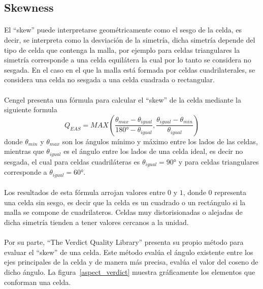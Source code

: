 \documentclass[letterpaper, openright, 12pt]{book}
\begin{document}
    \subsection{Skewness}
    \paragraph*{}
    El ``skew'' puede interpretarse geométricamente como el sesgo de la celda,
    es decir, se interpreta como la desviación de la simetría, dicha simetría
    depende del tipo de celda que contenga la malla, por ejemplo para celdas
    triangulares la simetría corresponde a una celda equilátera la cual por lo
    tanto se considera no sesgada. En el caso en el que la malla está formada
    por celdas cuadrilaterales, se considera una celda no sesgada a una celda
    cuadrada o rectangular.

    \paragraph*{}
    Cengel \cite{cengel} presenta una fórmula para calcular el ``skew'' de la
    celda mediante la siguiente formula
    \begin{equation}
      Q_{EAS} = MAX \left(
      \frac{\theta_{max} - \theta_{igual}}{180\si{\degree} - \theta_{igual}},
      \frac{\theta_{igual} - \theta_{min}}{\theta_{igual}}
      \right)
    \end{equation}
    donde $\theta_{min}$ y $\theta_{max}$ son los ángulos mínimo y máximo entre
    los lados de las celdas, mientras que $\theta_{igual}$ es el ángulo entre
    los lados de una celda ideal, es decir no sesgada, el cual para celdas
    cuadriláteras es $\theta_{igual} = 90\si{\degree}$ y para celdas
    triangulares corresponde a $\theta_{igual} = 60\si{\degree}$.

    \paragraph*{}
    Los resultados de esta fórmula arrojan valores entre $0$ y $1$, donde $0$
    representa una celda sin sesgo, es decir que la celda es un cuadrado o un
    rectángulo si la malla se compone de cuadrilateros. Celdas muy
    distorisionadas o alejadas de dicha simetría tienden a tener valores
    cercanos a la unidad.

    \paragraph*{}
    Por su parte, ``The Verdict Quality Library'' presenta su propio método
    para evaluar el ``skew'' de una celda. Este método evalúa el ángulo
    existente entre los ejes principales de la celda y de manera más precisa,
    evalúa el valor del coseno de dicho ángulo. La figura~\ref{aspect_verdict}
    muestra gráficamente los elementos que conforman una celda.  
\end{document}
